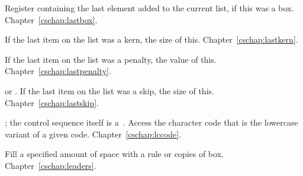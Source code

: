 \begin{glossinventory}
\item [\cs{lastbox}]
      Register containing the last element  added to the current list, 
      if this was a box.
Chapter~\ref{cschap:lastbox}.

\item [\cs{lastkern}]
      If the last item on the list was a kern, the size of this.
Chapter~\ref{cschap:lastkern}.

\item [\cs{lastpenalty}]
      If the last item on the list was a penalty, the value of this.
Chapter~\ref{cschap:lastpenalty}.

\item [\cs{lastskip}]
       or .
      If the last item on the list was a skip, the size of this.
Chapter~\ref{cschap:lastskip}.

\item [\cs{lccode\gr{8-bit number}}]
      ; the control sequence itself
      is a~.
      Access the
      character code that is the lowercase variant of a given code.
Chapter~\ref{cschap:lccode}.

\item [\cs{leaders\gr{box or rule}\gr{vertical/horizontal/mathematical skip}}]
      Fill a specified amount of space with a rule or copies of box.
Chapter~\ref{cschap:leaders}.


\end{glossinventory}
